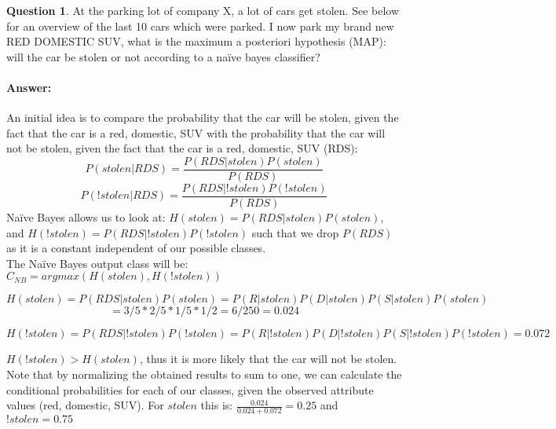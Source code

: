 \documentclass[11pt,a4paper]{article}
\theoremstyle{definition}%
\newtheorem{Q}{Question}[] %
\newcommand{\reponse}[1]{%
\ifthenelse {\boolean{corrige}} {\paragraph{Answer:} \color{darkblue}   #1\color{black}} {}
}
\begin{document}
\begin{Q}
    At the parking lot of company X, a lot of cars get stolen. See below for an overview of the last 10
cars which were parked. I now park my brand new RED DOMESTIC SUV, what is the maximum
a posteriori hypothesis (MAP): will the car be stolen or not according to a na\"ive bayes classifier?
\reponse{
    An initial idea is to compare the probability that the car will be stolen, given the fact
that the car is a red, domestic, SUV with the probability that the car will not be stolen, given the
fact that the car is a red, domestic, SUV (RDS):
$$P(stolen|RDS) = \frac{P(RDS|stolen) P(stolen)}{P(RDS)}$$
$$P(!stolen|RDS) = \frac{P(RDS|!stolen) P(!stolen)}{P(RDS)}$$
Naïve Bayes allows us to look at:
$H(stolen) = P(RDS|stolen)P(stolen)$, and
$H(!stolen) = P(RDS|!stolen)P(!stolen)$ such that we drop $P(RDS)$ as it is a constant independent
of our possible classes.\\
The Naïve Bayes output class will be:
$C_{NB} = argmax(H(stolen),H(!stolen))$

$$ H(stolen) = P(RDS|stolen) P(stolen) = P(R|stolen) P(D|stolen) P(S|stolen) P(stolen)$$
$$= 3/5 * 2/5 * 1/5 * 1/2 = 6/250 = 0.024 $$ 

$$ H(!stolen) = P(RDS|!stolen) P(!stolen) = P(R|!stolen) P(D|!stolen) P(S|!stolen) P(!stolen) = 0.072$$

$H(!stolen) > H(stolen)$, thus it is more likely that the car will not be stolen.
Note that by normalizing the obtained results to sum to one, we can calculate the conditional
probabilities for each of our classes, given the observed attribute values (red, domestic, SUV).
For $stolen$ this is: $\frac{0.024}{0.024+0.072} = 0.25$ and $!stolen = 0.75$
}
\end{Q}
\end{document}
